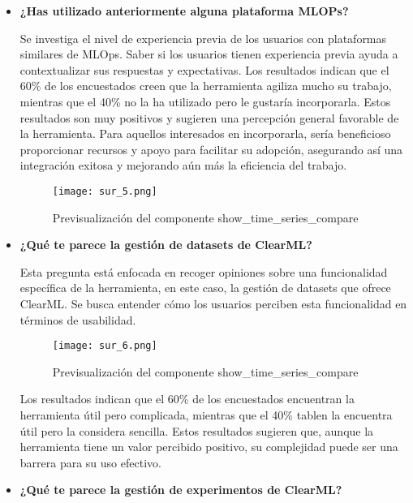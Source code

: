 \begin{itemize}
    \item \textbf{¿Has utilizado anteriormente alguna plataforma MLOPs?}

    Se investiga el nivel de experiencia previa de los usuarios con plataformas 
    similares de MLOps. Saber si los usuarios tienen experiencia previa ayuda 
    a contextualizar sus respuestas y expectativas. Los resultados indican que el 60\% de 
    los encuestados creen que la herramienta agiliza mucho su trabajo, mientras que el 40\% no 
    la ha utilizado pero le gustaría incorporarla. Estos resultados son muy positivos y sugieren una 
    percepción general favorable de la herramienta. Para aquellos interesados 
    en incorporarla, sería beneficioso proporcionar recursos y apoyo para facilitar 
    su adopción, asegurando así una integración exitosa y mejorando aún más la 
    eficiencia del trabajo.

    \begin{figure}[!h]
        \centering
        \texttt{[image: sur\_5.png]}
        \caption{Previsualización del componente show\_time\_series\_compare}
        \label{fig:sur_5}
    \end{figure}

    \item \textbf{¿Qué te parece la gestión de datasets de ClearML?} 
    
    Esta pregunta está 
    enfocada en recoger opiniones sobre una funcionalidad específica de la 
    herramienta, en este caso, la gestión de datasets que ofrece ClearML. 
    Se busca entender cómo los usuarios perciben esta funcionalidad en términos 
    de usabilidad.

    \begin{figure}[!h]
        \centering
        \texttt{[image: sur\_6.png]}
        \caption{Previsualización del componente show\_time\_series\_compare}
        \label{fig:sur_6}
    \end{figure}

    Los resultados indican que el 60\% de los encuestados encuentran la herramienta 
    útil pero complicada, mientras que el 40\% tablen la encuentra útil pero la considera 
    sencilla. Estos resultados sugieren que, aunque la herramienta tiene un valor 
    percibido positivo, su complejidad puede ser una barrera para su uso efectivo. 

    \item \textbf{¿Qué te parece la gestión de experimentos de ClearML?}


\end{itemize}
